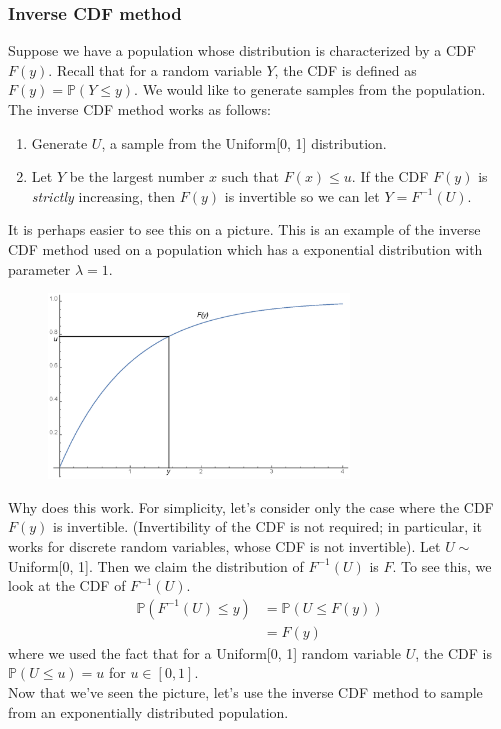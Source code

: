 \documentclass[12pt]{article}
\theoremstyle{definition}
\theoremstyle{remark}
\def\P{{\mathbb P}}
\begin{document}
\subsubsection{Inverse CDF method}
Suppose we have a population whose distribution is characterized by a CDF $F(y)$. Recall that for a random variable $Y$, the CDF is defined as $F(y) = \P(Y \leq y)$. We would like to generate samples from the population. The inverse CDF method works as follows:
\begin{enumerate}
\item Generate $U$, a sample from the Uniform[0, 1] distribution.
\item Let $Y$ be the largest number $x$ such that $F(x) \leq u$. If the CDF $F(y)$ is \emph{strictly} increasing, then $F(y)$ is invertible so we can let $Y = F^{-1}(U)$.
\end{enumerate}
It is perhaps easier to see this on a picture. This is an example of the inverse CDF method used on a population which has a exponential distribution with parameter $\lambda = 1$.
\begin{figure}[H]
\centering
\includegraphics[width=8cm]{inversecdfexp}
\end{figure}
Why does this work. For simplicity, let's consider only the case where the CDF $F(y)$ is invertible. (Invertibility of the CDF is not required; in particular, it works for discrete random variables, whose CDF is not invertible). Let $U \sim$ Uniform[0, 1]. Then we claim the distribution of $F^{-1}(U)$ is $F$. To see this, we look at the CDF of $F^{-1}(U)$.
\begin{align*}
\P( F^{-1}(U) \leq y) &= \P(U \leq F(y) ) \\
&= F(y)
\end{align*}
where we used the fact that for a Uniform[0, 1] random variable $U$, the CDF is $\P(U \leq u) = u$ for $u \in [0, 1]$.\\

Now that we've seen the picture, let's use the inverse CDF method to sample from an exponentially distributed population.
\end{document}
